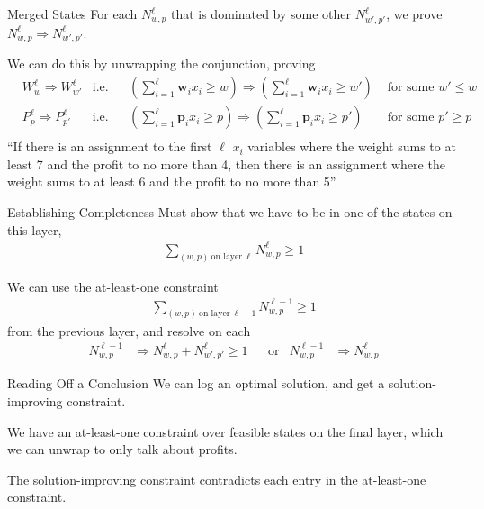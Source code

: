 \documentclass[aspectratio=169,compress,10pt]{beamer}
\begin{document}
\begin{frame}{Merged States}
    For each $N^\ell_{w,p}$ that is dominated by some other $N^\ell_{w',p'}$, we prove
        $N^\ell_{w,p} \Rightarrow N^\ell_{w',p'}$.

        \medskip

    We can do this by unwrapping the conjunction, proving
    \begin{align*}
        & W^\ell_{w} \Rightarrow W^\ell_{w'} & \text{i.e.} && (\sum_{i=1}^{\ell} \boldsymbol{w}_i
        x_i \ge w) \Rightarrow (\sum_{i=1}^{\ell} \boldsymbol{w}_i x_i \ge w') &\text{~for some~} w' \le w \\
        & P^\ell_{p} \Rightarrow P^\ell_{p'} & \text{i.e.} && (\sum_{i=1}^{\ell} \boldsymbol{p}_i
        x_i \ge p) \Rightarrow (\sum_{i=1}^{\ell} \boldsymbol{p}_i x_i \ge p') &\text{~for some~} p' \ge p \\
    \end{align*}
    ``If there is an assignment to the first $\ell$ $x_i$ variables where the weight sums to at
    least 7 and the profit to no more than 4, then there is an assignment where the weight sums
    to at least 6 and the profit to no more than 5''.
\end{frame}

\begin{frame}{Establishing Completeness}
    Must show that we have to be in one of the states on this layer,
    \begin{align*}
        \sum_{(w,p)~\text{on layer}~\ell} N^\ell_{w,p} \ge 1
    \end{align*}

    We can use the at-least-one constraint
    \begin{align*}
        \sum_{(w,p)~\text{on layer}~\ell - 1} N^{\ell-1}_{w,p} \ge 1
    \end{align*}
    from the previous layer, and resolve on each \begin{align*}
        N^{\ell-1}_{w,p} &\Rightarrow N^\ell_{w,p} + N^\ell_{w',p'} \ge 1 &&\text{or}&
        N^{\ell-1}_{w,p} &\Rightarrow N^\ell_{w,p}
    \end{align*}
\end{frame}

\begin{frame}{Reading Off a Conclusion}
    We can log an optimal solution, and get a solution-improving constraint.

    \bigskip

    We have an at-least-one constraint over feasible states on the final layer, which
    we can unwrap to only talk about profits.

    \bigskip

    The solution-improving constraint contradicts each entry in the at-least-one
    constraint.
\end{frame}
\end{document}
